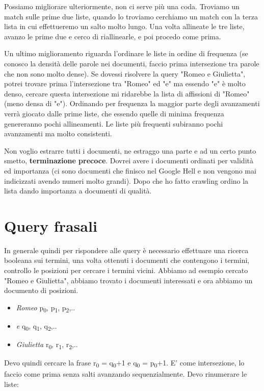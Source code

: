 \documentclass[12pt,italian]{report}
\begin{document}
\begin{itemize}
    Possiamo migliorare ulteriormente, non ci serve più una coda. Troviamo un match sulle prime due liste, quando lo troviamo cerchiamo un match con la terza lista in cui effettueremo un salto molto lungo. Una volta allineate le tre liste, avanzo le prime due e cerco di riallinearle, e poi procedo come prima.
    \vspace{50mm}
    
    Un ultimo miglioramento riguarda l'ordinare le liste in ordine di frequenza (se conosco la densità delle parole nei documenti, faccio prima intersezione tra parole che non sono molto dense). Se dovessi risolvere la query "Romeo e Giulietta", potrei trovare prima l'intersezione tra "Romeo" ed "e" ma essendo "e" è molto denso, cercare questa intersezione mi ridarebbe la lista di affissioni di "Romeo" (meno densa di "e"). Ordinando per frequenza la maggior parte degli avanzamenti verrà giocato dalle prime liste, che essendo quelle di minima frequenza genereranno pochi allineamenti. Le liste più frequenti subiranno pochi avanzamenti ma molto consistenti.
    
\end{itemize}
\bigbreak

Non voglio estrarre tutti i documenti, ne estraggo una parte e ad un certo punto smetto, \textbf{terminazione precoce}. Dovrei avere i documenti ordinati per validità ed importanza (ci sono documenti che finisco nel Google Hell e non vengono mai indicizzati avendo numeri molto grandi). Dopo che ho fatto crawling ordino la lista dando importanza a documenti di qualità. 
\bigbreak

\section{Query frasali}
\label{query frasali}
In generale quindi per rispondere alle query è necessario effettuare una ricerca booleana sui termini, una volta ottenuti i documenti che contengono i termini, controllo le posizioni per cercare i termini vicini. 
Abbiamo ad esempio cercato "Romeo e Giulietta", abbiamo trovato i documenti interessati e ora abbiamo un documento di posizioni.

\begin{itemize}
    \item \textit{Romeo} p\textsubscript{0}, p\textsubscript{1}, p\textsubscript{2},..
    \item \textit{e}  q\textsubscript{0}, q\textsubscript{1}, q\textsubscript{2},..
    \item \textit{Giulietta } r\textsubscript{0}, r\textsubscript{1}, r\textsubscript{2},..
\end{itemize}
\bigbreak
\noindent Devo quindi cercare la frase r\textsubscript{0} = q\textsubscript{0}+1 e q\textsubscript{0} = p\textsubscript{0}+1.
\noindent E' come intersezione, lo faccio come prima senza salti avanzando sequenzialmente. Devo rinumerare le liste:
\end{document}
